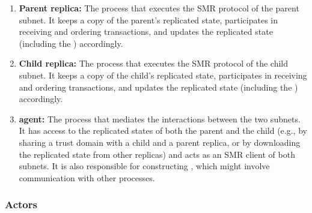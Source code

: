 \begin{enumerate}
    
    \item \textbf{Parent replica:} The process that executes the SMR protocol of the parent subnet. It keeps a copy of the parent's replicated state, participates in receiving and ordering transactions, and updates the replicated state (including the \sa) accordingly.
    
    \item \textbf{Child replica:} The process that executes the SMR protocol of the child subnet. It keeps a copy of the child's replicated state, participates in receiving and ordering transactions, and updates the replicated state (including the \gw) accordingly. 

    \item \textbf{\ipc agent:} The process that mediates the interactions between the two subnets.
    It has access to the replicated states of both the parent and the child
    (e.g., by sharing a trust domain with a child and a parent replica, or by downloading the replicated state from other replicas)
    and acts as an SMR client of both subnets.
    It is also responsible for constructing \pofsFull, which might involve communication with other processes.

\end{enumerate}
 
 \subsubsection{Actors}

